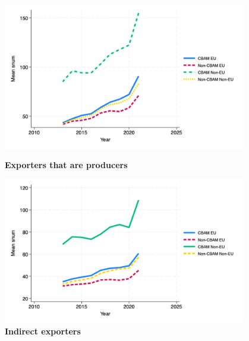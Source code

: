 \documentclass{article}
\begin{document}
\begin{figure}[H]
\centering
\includegraphics[width=0.95\textwidth]{snum_ep.png}
\caption{\textbf{Exporters that are producers}}
\includegraphics[width=0.95\textwidth]{snum_indir.png}
\caption{\textbf{Indirect exporters}}
\end{figure}
\end{document}

